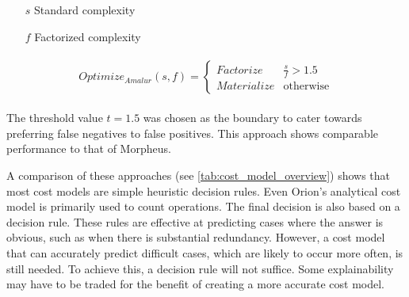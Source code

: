\begin{definition}

    \begin{itemize}
        \item[]
        \item[$s$] Standard complexity
        \item[$f$] Factorized complexity
    \end{itemize}

    \begin{align*}
        \begin{split}
            Optimize_{Amalur}(s, f) =
            \begin{cases}
                Factorize   & \frac{s}{f} > 1.5 \\
                Materialize & \text{otherwise}
            \end{cases}
        \end{split}
    \end{align*}
\end{definition}

The threshold value $t = 1.5 $ was chosen as the boundary to cater towards preferring false negatives to false positives. This approach shows comparable performance to that of Morpheus.

A comparison of these approaches (see \autoref{tab:cost_model_overview}) shows that most cost models are simple heuristic decision rules. Even Orion's analytical cost model is primarily used to count operations. The final decision is also based on a decision rule. These rules are effective at predicting cases where the answer is obvious, such as when there is substantial redundancy. However, a cost model that can accurately predict difficult cases, which are likely to occur more often, is still needed. To achieve this, a decision rule will not suffice. Some explainability may have to be traded for the benefit of creating a more accurate cost model.

